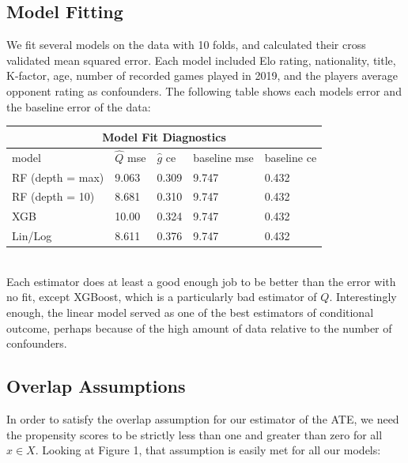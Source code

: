 \documentclass[letterpaper, 11pt]{article}
\begin{document}
    \subsection*{Model Fitting}
        We fit several models on the data with 10 folds, and calculated their cross validated mean squared error. 
        Each model included Elo rating, nationality, title, K-factor, age, number of recorded games played in 2019, and the players average opponent rating as confounders.
        The following table shows each models error and the baseline error of the data:

        \begin{tabular}{ |p{4cm}||p{2cm}|p{2cm}|p{3cm}|p{3cm}| }
            \hline
            \multicolumn{5}{|c|}{Model Fit Diagnostics} \\
            \hline
            model & $\hat{Q}$ mse & $\hat{g}$ ce & baseline mse & baseline ce\\
            \hline
            RF (depth = max) & 9.063 & 0.309 & 9.747 & 0.432 \\
            RF (depth = 10)  & 8.681 & 0.310 & 9.747 & 0.432 \\
            XGB              & 10.00 & 0.324 & 9.747 & 0.432 \\
            Lin/Log          & 8.611 & 0.376 & 9.747 & 0.432 \\
            \hline
        \end{tabular} \\

        Each estimator does at least a good enough job to be better than the error with no fit, except XGBoost, which is a particularly bad estimator of $Q$.
        Interestingly enough, the linear model served as one of the best estimators of conditional outcome, perhaps because of the high amount of data relative to the number of confounders.

    \subsection*{Overlap Assumptions}

        In order to satisfy the overlap assumption for our estimator of the ATE, we need the propensity scores to be strictly less than one and greater than zero for all $x \in X$. 
        Looking at Figure 1, that assumption is easily met for all our models:
\end{document}
